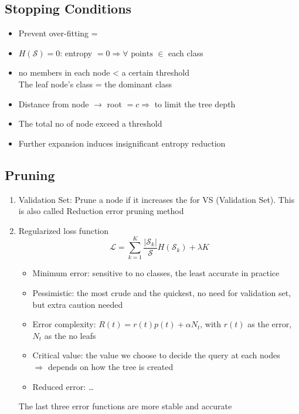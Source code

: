

\subsection{Stopping Conditions}
\begin{itemize}
	\item Prevent over-fitting = 
	\item $H(\mathcal{S}) = 0$: entropy $= 0 \Rightarrow \forall \text{ points } \in$ each class
	\item \ac{no} members in each node < a certain threshold\\
	The leaf node's class = the dominant class
	\item Distance from node $\rightarrow$ root $= c \Rightarrow$ to limit the tree depth
	\item The total \ac{no} of node exceed a threshold
	\item Further expansion induces insignificant entropy reduction
\end{itemize}

\subsection{Pruning}
\begin{enumerate}
	\item Validation Set: Prune a node if it increases the  for VS (Validation Set). This is also called Reduction error pruning method
	\item Regularized loss function
	\begin{equation}
		\mathcal{L} = \sum_{k=1}^{K} \frac{|\mathcal{S}_k|}{\mathcal{S}} H(\mathcal{S}_k) + \lambda K
	\end{equation}
	\begin{itemize}
		\item Minimum error: sensitive to \ac{no} classes, the least accurate in practice
		\item Pessimistic: the most crude and the quickest, no need for validation set, but extra caution needed
		\item Error complexity: $R(t) = r(t) p(t) + \alpha N_t$, with $r(t)$ as the error, $N_t$ as the \ac{no} leafs
		\item Critical value: the value we choose to decide the query at each nodes\\
		$\Rightarrow$ depends on how the tree is created
		\item Reduced error: \dots
	\end{itemize}
	\note The last three error functions are more stable and accurate
\end{enumerate}

